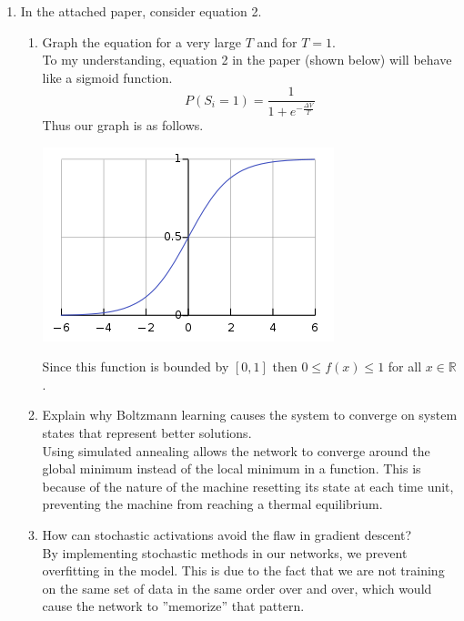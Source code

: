 \documentclass[notitlepage]{report}
\theoremstyle{plain} %
\theoremstyle{definition} %
\theoremstyle{plain} %
\begin{document}
\begin{enumerate}
\item In the attached paper, consider equation 2.
	\begin{enumerate}
	\item Graph the equation for a very large $T$ and for $T=1$.
	\medskip\\
		To my understanding, equation 2 in the paper (shown below) will behave like a sigmoid function.
		\[ P(S_i = 1) = \dfrac{1}{1+e^{-\frac{\Delta V}{T}}} \]
		Thus our graph is as follows.\\
		\begin{center}
		\includegraphics[scale=0.5]{sigmoid.png}
		\end{center}
		Since this function is bounded by $[0,1]$ then $0 \leq f(x) \leq 1$ for all $x\in\mathbb{R}$.
	
	\item Explain why Boltzmann learning causes the system to converge on system states that represent better solutions.
	\medskip\\
		Using simulated annealing allows the network to converge around the global minimum instead of the local minimum in a function. This is because of the nature of the machine resetting its state at each time unit, preventing the machine from reaching a thermal equilibrium.
		
	\item How can stochastic activations avoid the flaw in gradient descent?
	\medskip\\
		By implementing stochastic methods in our networks, we prevent overfitting in the model. This is due to the fact that we are not training on the same set of data in the same order over and over, which would cause the network to ''memorize'' that pattern.
	\end{enumerate}
	

\end{enumerate}
\end{document}
